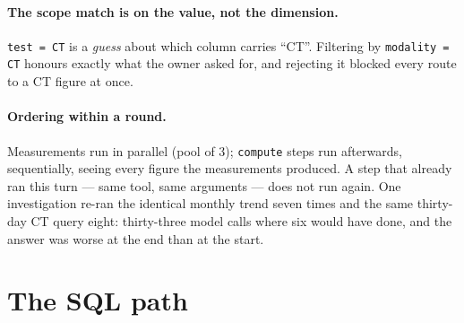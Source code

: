 \documentclass[11pt,a4paper]{report}
\newcommand{\code}[1]{\texttt{\small #1}}
\begin{document}
\paragraph{The scope match is on the value, not the dimension.} \code{test = CT} is a \emph{guess}
about which column carries ``CT''. Filtering by \code{modality = CT} honours exactly what the owner
asked for, and rejecting it blocked every route to a CT figure at once.

\paragraph{Ordering within a round.} Measurements run in parallel (pool of 3); \code{compute} steps
run afterwards, sequentially, seeing every figure the measurements produced. A step that already
ran this turn --- same tool, same arguments --- does not run again. One investigation re-ran the
identical monthly trend seven times and the same thirty-day CT query eight: thirty-three model calls
where six would have done, and the answer was worse at the end than at the start.

\section{The SQL path}
\end{document}
